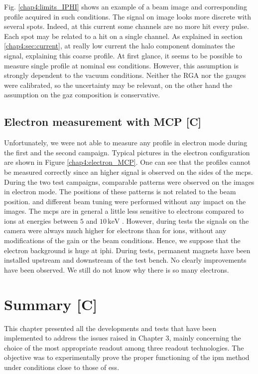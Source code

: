 \begin{refsection}
  Fig. \ref{chap4:limits_IPHI} shows an example of a beam image and corresponding profile acquired in such conditions. The signal on image looks more discrete with several spots. Indeed, at this current some channels are no more hit every pulse. Each spot may be related to a hit on a single channel. As explained in section \ref{chap4:sec:current}, at really low current the halo component dominates the signal, explaining this coarse profile.
  At first glance, it seems to be possible to measure single profile at nominal \acrshort{ess} conditions. However, this assumption is strongly dependent to the vacuum conditions. Neither the RGA nor the gauges were calibrated, so the uncertainty may be relevant, on the other hand the assumption on the gaz composition is conservative.

  

  \subsection{Electron measurement with MCP [C]}
  Unfortunately, we were not able to measure any profile in electron mode during the first and the second campaign.
  Typical pictures in the electron configuration are shown in Figure \ref{chap4:electron_MCP}. One can see that the profiles cannot be measured correctly since an higher signal is observed on the sides of the \acrshort{mcp}s. During the two test campaigns, comparable patterns were observed on the images in electron mode. The positions of these patterns is not related to the beam position.
  and different beam tuning were performed without any impact on the images.
  The \acrshort{mcp}s are in general a little less sensitive to electrons compared to ions at energies between $5$ and $10\,\mathrm{keV}$ \cite{Wiza1979}.
  However, during tests the signals on the camera were always much higher for electrons than for ions, without any modifications of the gain or the beam conditions.
  Hence, we suppose that the electron background is huge at \acrshort{iphi}.
  During tests, permanent magnets have been installed upstream and downstream of the test bench. No clearly improvements have been observed. We still do not know why there is so many electrons.
  

  \section{Summary [C]}
  \label{ch4:Summary}
  This chapter presented all the developments and tests that have been implemented to address the issues raised in Chapter 3, mainly concerning the choice of the most appropriate readout among three readout technologies. The objective was to experimentally prove the proper functioning of the \acrshort{ipm} method under conditions close to those of \acrshort{ess}.


\end{refsection}
